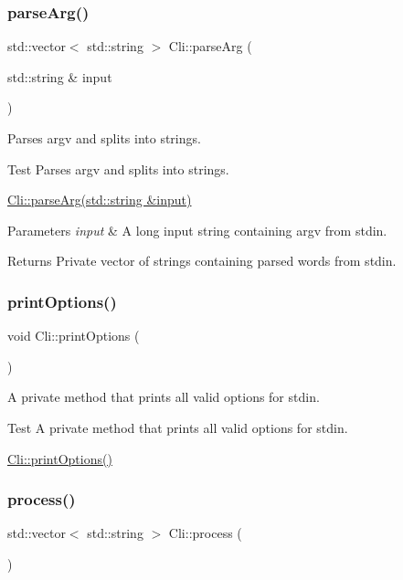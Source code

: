 \subsubsection{\texorpdfstring{parse\+Arg()}{parseArg()}}
{\footnotesize\ttfamily std\+::vector$<$ std\+::string $>$ Cli\+::parse\+Arg (\begin{DoxyParamCaption}\item[{std\+::string \&}]{input }\end{DoxyParamCaption})\hspace{0.3cm}{\ttfamily [private]}}



Parses argv and splits into strings. 

Test Parses argv and splits into strings.

\hyperlink{classCli_a8c364ee0c6abe9589a4e0c8758d17f88}{Cli\+::parse\+Arg(std\+::string \&input)} 
\begin{DoxyParams}{Parameters}
{\em input} & A long input string containing argv from stdin. \\
\hline
\end{DoxyParams}
\begin{DoxyReturn}{Returns}
Private vector of strings containing parsed words from stdin. 
\end{DoxyReturn}
\mbox{\label{classCli_a8251d6c89698aaf128318fc3ad4b2906}} 
\subsubsection{\texorpdfstring{print\+Options()}{printOptions()}}
{\footnotesize\ttfamily void Cli\+::print\+Options (\begin{DoxyParamCaption}{ }\end{DoxyParamCaption})\hspace{0.3cm}{\ttfamily [private]}}



A private method that prints all valid options for stdin. 

Test A private method that prints all valid options for stdin.

\hyperlink{classCli_a8251d6c89698aaf128318fc3ad4b2906}{Cli\+::print\+Options()} \mbox{\label{classCli_a9788fa4a19943c09af95b4653822d690}} 
\subsubsection{\texorpdfstring{process()}{process()}}
{\footnotesize\ttfamily std\+::vector$<$ std\+::string $>$ Cli\+::process (\begin{DoxyParamCaption}{ }\end{DoxyParamCaption})\hspace{0.3cm}{\ttfamily [virtual]}}



